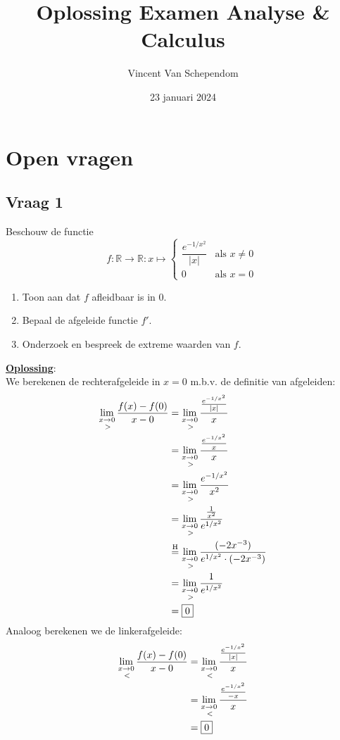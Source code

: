 \documentclass[kulak]{kulakarticle} %
\title{Oplossing Examen Analyse \& Calculus}
\author{Vincent Van Schependom}
\date{23 januari 2024}
\newcommand{\R}{\mathbb{R}}
\renewcommand{\boxed}[1]{\text{\fboxsep=.3em\fbox{#1}}}
\newcommand{\llim}{\underset{<}{\lim_{x\to0} \,} }
\newcommand{\rlim}{\underset{>}{\lim_{x\to0} \,} }
\newcommand{\hopital}{\overset{\mathrm{H}}{=}}
\begin{document}
	\maketitle

	\section*{Open vragen}

	\subsection*{Vraag 1}
	\renewcommand{\arraystretch}{2}
	Beschouw de functie \[ f :\R \to \R : x \mapsto \left\{
	\begin{array}{ll}
		\dfrac{  e^{-1/x^2}  }{ |x| } 	& \text{als } x\neq0 \\
		0 														& \text{als } x=0
	\end{array} \right. \ \]

	\begin{enumerate}
		\item Toon aan dat \(f\) afleidbaar is in \(0\).
		\item Bepaal de afgeleide functie \(f'\).
		\item Onderzoek en bespreek de extreme waarden van \(f\).
	\end{enumerate}

	\textbf{\underline{Oplossing}}:\\

	We berekenen de rechterafgeleide in \(x=0\) m.b.v. de definitie van afgeleiden:
	\begin{align*}
		\rlim \frac{f(x)-f(0)}{x-0} & = \rlim \frac{\frac{  e^{-1/x^2}  }{ |x| } }{x} \\
													& = \rlim \frac{\frac{  e^{-1/x^2}  }{ x } }{x} \\
													& = \rlim \frac{  e^{-1/x^2}  }{x^2} \\
													& = \rlim \frac{  \frac{1}{x^2}  }{e^{1/x^2}} \\
													& \hopital \rlim \frac{  (-2x^{-3})  }{e^{1/x^2} \cdot (-2x^{-3}) } \\
													& = \rlim  \frac{  1  }{e^{1/x^2} } \\
													& = \boxed{0} \\
	\end{align*}
	Analoog berekenen we de linkerafgeleide:
	\begin{align*}
		\llim \frac{f(x)-f(0)}{x-0} & = \llim \frac{\frac{  e^{-1/x^2}  }{ |x| } }{x} \\
													& = \llim \frac{\frac{  e^{-1/x^2}  }{ -x } }{x} \\
													& = \boxed{0}
	\end{align*}
\end{document}
